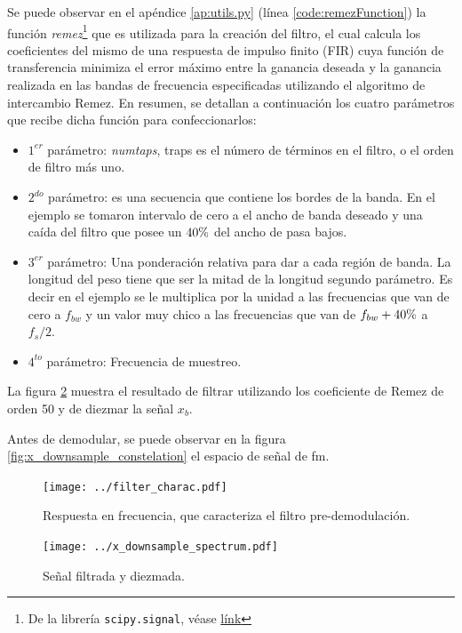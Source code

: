 Se puede observar en el apéndice \ref{ap:utils.py} (línea \ref{code:remezFunction}) la función \emph{remez}\footnote{De la librería \texttt{scipy.signal}, véase \href{https://docs.scipy.org/doc/scipy/reference/generated/scipy.signal.remez.html}{línk}} que es utilizada para la creación del filtro, el cual calcula los coeficientes del mismo de una respuesta de impulso finito (FIR) cuya función de transferencia minimiza el error máximo entre la ganancia deseada y la ganancia realizada en las bandas de frecuencia especificadas utilizando el algoritmo de intercambio Remez.
En resumen, se detallan a continuación los cuatro parámetros que recibe dicha función para confeccionarlos: 
\begin{itemize}
	\item $1^{er}$ parámetro: \emph{numtaps}, traps es el número de términos en el filtro, o el orden de filtro más uno.
	\item $2^{do}$ parámetro: es una secuencia que contiene los bordes de la banda.
	En el ejemplo se tomaron intervalo de cero a el ancho de banda deseado y una caída del filtro que posee un $40\%$ del ancho de pasa bajos. 
	\item $3^{er}$ parámetro: Una ponderación relativa para dar a cada región de banda. La longitud del peso tiene que ser la mitad de la longitud segundo parámetro.
	Es decir en el ejemplo se le multiplica por la unidad a las frecuencias que van de cero a $f_{bw}$ y un valor muy chico a las frecuencias que van de $f_{bw} + 40\%$ a $f_s/2$.
	\item $4^{to}$ parámetro: Frecuencia de muestreo.
\end{itemize}

La figura \ref{fig:x_downsample_spectrum} muestra el resultado de filtrar utilizando los coeficiente de Remez de orden 50 y de diezmar la señal $x_b$.

Antes de demodular, se puede observar en la figura \ref{fig:x_downsample_constelation} el espacio de señal de fm. 

\begin{figure}[ht!]
	\centering
	\texttt{[image: ../filter\_charac.pdf]}
	\caption{Respuesta en frecuencia, que caracteriza el filtro pre-demodulación.}
	\label{fig:filter_charac}
\end{figure}

\begin{figure}[ht!]
	\centering
	\texttt{[image: ../x\_downsample\_spectrum.pdf]}
	\caption{Señal filtrada y diezmada.}
	\label{fig:x_downsample_spectrum}
\end{figure}

